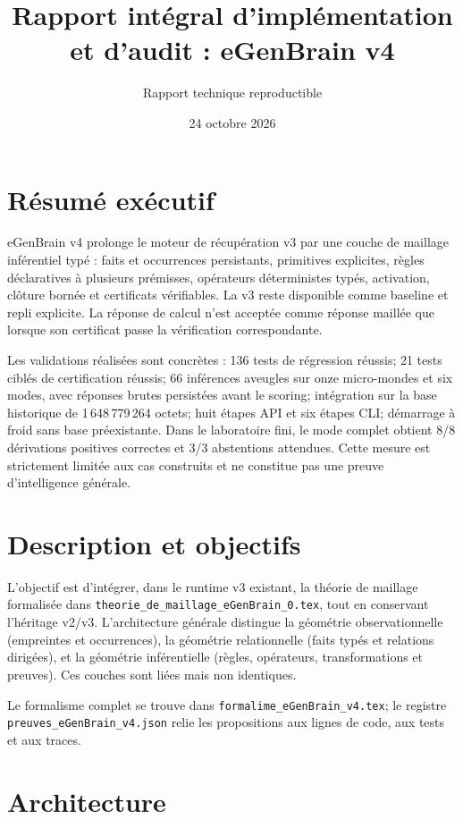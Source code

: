 \documentclass[11pt,a4paper]{book}
\title{Rapport intégral d'implémentation et d'audit : eGenBrain v4}
\author{Rapport technique reproductible}
\date{24 octobre 2026}
\begin{document}
\maketitle
\chapter*{Résumé exécutif}
eGenBrain v4 prolonge le moteur de récupération v3 par une couche de maillage inférentiel typé : faits et occurrences persistants, primitives explicites, règles déclaratives à plusieurs prémisses, opérateurs déterministes typés, activation, clôture bornée et certificats vérifiables. La v3 reste disponible comme baseline et repli explicite. La réponse de calcul n'est acceptée comme réponse maillée que lorsque son certificat passe la vérification correspondante.

Les validations réalisées sont concrètes : 136 tests de régression réussis; 21 tests ciblés de certification réussis; 66 inférences aveugles sur onze micro-mondes et six modes, avec réponses brutes persistées avant le scoring; intégration sur la base historique de 1\,648\,779\,264 octets; huit étapes API et six étapes CLI; démarrage à froid sans base préexistante. Dans le laboratoire fini, le mode complet obtient 8/8 dérivations positives correctes et 3/3 abstentions attendues. Cette mesure est strictement limitée aux cas construits et ne constitue pas une preuve d'intelligence générale.

\chapter{Description et objectifs}
L'objectif est d'intégrer, dans le runtime v3 existant, la théorie de maillage formalisée dans \texttt{theorie\_de\_maillage\_eGenBrain\_0.tex}, tout en conservant l'héritage v2/v3. L'architecture générale distingue la géométrie observationnelle (empreintes et occurrences), la géométrie relationnelle (faits typés et relations dirigées), et la géométrie inférentielle (règles, opérateurs, transformations et preuves). Ces couches sont liées mais non identiques.

Le formalisme complet se trouve dans \texttt{formalime\_eGenBrain\_v4.tex}; le registre \texttt{preuves\_eGenBrain\_v4.json} relie les propositions aux lignes de code, aux tests et aux traces.

\chapter{Architecture}
\end{document}
